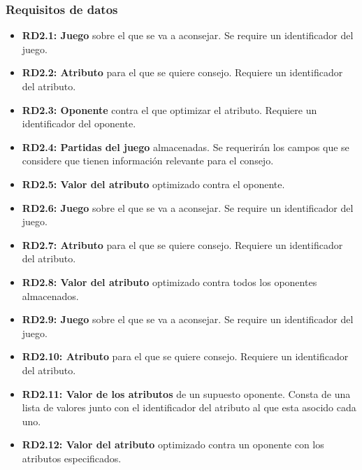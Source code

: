 \subsubsection{Requisitos de datos}

	\begin{itemize}
		\item \textbf{RD2.1: Juego} sobre el que se va a aconsejar.
			Se require un identificador del juego.

		\item \textbf{RD2.2: Atributo} para el que se quiere consejo.
			Requiere un identificador del atributo.

		\item \textbf{RD2.3: Oponente} contra el que optimizar el atributo.
			Requiere un identificador del oponente.

		\item \textbf{RD2.4: Partidas del juego} almacenadas. 
			Se requerirán los campos que se considere que tienen información
			relevante para el consejo.

		\item \textbf{RD2.5: Valor del atributo} optimizado contra el oponente. 

		\item \textbf{RD2.6: Juego} sobre el que se va a aconsejar.
			Se require un identificador del juego.

		\item \textbf{RD2.7: Atributo} para el que se quiere consejo.
			Requiere un identificador del atributo.

		\item \textbf{RD2.8: Valor del atributo} optimizado contra todos los
			oponentes almacenados. 

		\item \textbf{RD2.9: Juego} sobre el que se va a aconsejar.
			Se require un identificador del juego.

		\item \textbf{RD2.10: Atributo} para el que se quiere consejo.
			Requiere un identificador del atributo.

		\item \textbf{RD2.11: Valor de los atributos} de un supuesto oponente.
			Consta de una lista de valores junto con el identificador del
			atributo al que esta asocido cada uno.

		\item \textbf{RD2.12: Valor del atributo} optimizado contra un oponente 
			con los atributos especificados. 
	\end{itemize}


